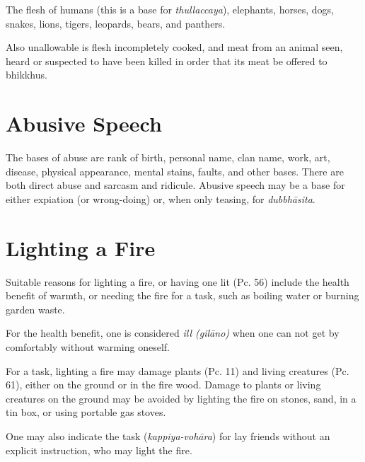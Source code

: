 The flesh of humans (this is a base for \emph{thullaccaya}), elephants, horses,
dogs, snakes, lions, tigers, leopards, bears, and panthers.\\
\mbox{}

Also unallowable is flesh incompletely cooked, and meat from an animal seen,
heard or suspected to have been killed in order that its meat be offered to
bhikkhus.\\
\mbox{}

\section*{Abusive Speech}

The bases of abuse are rank of birth, personal name, clan name, work, art,
disease, physical appearance, mental stains, faults, and other bases. There are
both direct abuse and sarcasm and ridicule. Abusive speech may be a base for
either expiation (or wrong-doing) or, when only teasing, for \emph{dubbhāsita}.


\section*{Lighting a Fire}

Suitable reasons for lighting a fire, or having one lit (Pc. 56) include the
health benefit of warmth, or needing the fire for a task, such as boiling water
or burning garden waste.

For the health benefit, one is considered \emph{ill (gilāno)} when one can not get by
comfortably without warming oneself.

For a task, lighting a fire may damage plants (Pc. 11) and living creatures (Pc.
61), either on the ground or in the fire wood. Damage to plants or living
creatures on the ground may be avoided by lighting the fire on stones, sand, in
a tin box, or using portable gas stoves.

One may also indicate the task (\emph{kappiya-vohāra}) for lay friends without
an explicit instruction, who may light the fire.

